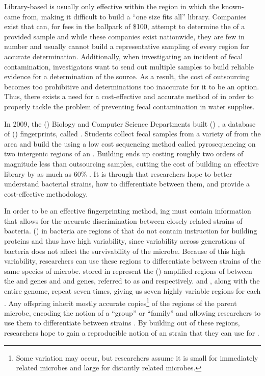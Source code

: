 Library-based \mst{} is usually only effective within the region in which the known-\spec{} \isols{} came from, making it difficult to build a ``one size fits all'' library.
Companies exist that can, for fees in the ballpark of \$100, attempt to determine the \spec{} of a provided sample
and while these companies exist nationwide, they are few in number and usually cannot build a representative sampling of every region for accurate \spec{} determination.
Additionally, when investigating an incident of fecal contamination, investigators want to send out multiple samples to build reliable evidence for a determination of the source.
As a result, the cost of outsourcing becomes too prohibitive and determinations too inaccurate for it to be an option.
Thus, there exists a need for a cost-effective and accurate method of \mst{} in order to properly tackle the problem of preventing fecal contamination in water supplies.

In 2009, the \cplong{} (\cp{}) Biology and Computer Science Departments built \cploplong{} (\cplop{}) \cite{soliman2013cplop}, a database of \ecolilong{} (\ecoli{}) \isol{} fingerprints, called \pyros{}.
Students collect fecal samples from a variety of \spec{} from the \slo{} area and build the \pyros{} using a low cost \dna{} sequencing method called pyrosequencing on two intergenic regions of an \ecoli{} \isol{}.
Building \pyros{} ends up costing roughly two orders of magnitude less than outsourcing samples, cutting the cost of building an effective \mst{} library by as much as 60\% \cite{Black2014121}.
It is through \cplop{} that \cp{} researchers hope to better understand bacterial strains, how to differentiate between them, and provide a cost-effective \mst{} methodology.

In order to be an effective \mst{} fingerprinting method, \pyro{}ing must contain information that allows for the accurate discrimination between closely related strains of \ecoli{} bacteria.
\ITSlongs{} (\itsshort{}) in bacteria are regions of \dna{} that do not contain instruction for building proteins and thus have high variability, since variability across generations of bacteria does not affect the survivability of the microbe.
Because of this high variability, researchers can use these regions to differentiate between strains of the same species of microbe.
\ecoli{} \isol{} \pyros{} stored in \cplop{} represent the \pcrlong{} (\pcr{})-amplified regions of \dna{} between the \Gsixt{} and \Gtwen{} genes and \Gtwen{} and \Gfive{} genes, referred to as \Ssixt{} and \Sfive{} respectively.
\Ssixt{} and \Sfive{}, along with the entire \ecoli{} genome, repeat seven times, giving us seven highly variable regions for each \itsshort{}.
Any offspring inherit mostly accurate copies\footnote{Some variation may occur, but researchers assume it is small for immediately related microbes and large for distantly related microbes.} of the \itsshort{} regions of the parent microbe, encoding the notion of a ``group'' or ``family'' and allowing researchers to use them to differentiate between strains \cite{SolimanDVMBNWKG12}.
By building \pyros{} out of these regions, \cplop{} researchers hope to gain a reproducible notion of an \ecoli{} strain that they can use for \mst{}.

